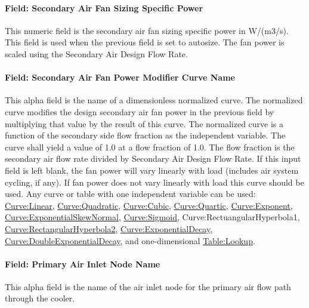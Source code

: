 \paragraph{Field: Secondary Air Fan Sizing Specific Power}\label{field-secondary-air-fan-sizing-specific-power}

This numeric field is the secondary air fan sizing specific power in W/(m3/s). This field is used when the previous field is set to autosize. The fan power is scaled using the Secondary Air Design Flow Rate.

\paragraph{Field: Secondary Air Fan Power Modifier Curve Name}\label{field-secondary-air-fan-power-modifier-curve-name}

This alpha field is the name of a dimensionless normalized curve. The normalized curve modifies the design secondary air fan power in the previous field by multiplying that value by the result of this curve. The normalized curve is a function of the secondary side flow fraction as the independent variable. The curve shall yield a value of 1.0 at a flow fraction of 1.0. The flow fraction is the secondary air flow rate divided by Secondary Air Design Flow Rate. If this input field is left blank, the fan power will vary linearly with load (includes air system cycling, if any). If fan power does not vary linearly with load this curve should be used. Any curve or table with one independent variable can be used: \hyperref[curvelinear]{Curve:Linear}, \hyperref[curvequadratic]{Curve:Quadratic}, \hyperref[curvecubic]{Curve:Cubic}, \hyperref[curvequartic]{Curve:Quartic}, \hyperref[curveexponent]{Curve:Exponent}, \hyperref[curveexponentialskewnormal]{Curve:ExponentialSkewNormal}, \hyperref[curvesigmoid]{Curve:Sigmoid}, Curve:RectuangularHyperbola1, \hyperref[curverectangularhyperbola2]{Curve:RectangularHyperbola2}, \hyperref[curveexponentialdecay]{Curve:ExponentialDecay}, \hyperref[curvedoubleexponentialdecay]{Curve:DoubleExponentialDecay}, and one-dimensional \hyperref[tablelookup]{Table:Lookup}.

\paragraph{Field: Primary Air Inlet Node Name}\label{field-primary-air-inlet-node-name-2}

This alpha field is the name of the air inlet node for the primary air flow path through the cooler.

